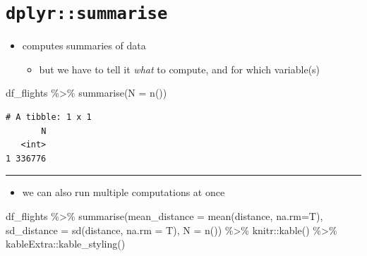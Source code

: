 \documentclass[
  letterpaper,
  DIV=11]{scrartcl}
\newenvironment{Shaded}{\begin{snugshade}}{\end{snugshade}}
\newcommand{\AttributeTok}[1]{\textcolor[rgb]{0.40,0.45,0.13}{#1}}
\newcommand{\FunctionTok}[1]{\textcolor[rgb]{0.28,0.35,0.67}{#1}}
\newcommand{\NormalTok}[1]{\textcolor[rgb]{0.00,0.23,0.31}{#1}}
\newcommand{\SpecialCharTok}[1]{\textcolor[rgb]{0.37,0.37,0.37}{#1}}
\providecommand{\tightlist}{%
  \setlength{\itemsep}{0pt}\setlength{\parskip}{0pt}}\usepackage{longtable,booktabs,array}
\begin{document}
\hypertarget{dplyrsummarise}{%
\section{\texorpdfstring{\texttt{dplyr::summarise}}{dplyr::summarise}}\label{dplyrsummarise}}

\begin{itemize}
\tightlist
\item
  computes summaries of data

  \begin{itemize}
  \tightlist
  \item
    but we have to tell it \emph{what} to compute, and for which
    variable(s)
  \end{itemize}
\end{itemize}

\begin{Shaded}
\begin{Highlighting}[]
\NormalTok{df\_flights }\SpecialCharTok{\%\textgreater{}\%} 
  \FunctionTok{summarise}\NormalTok{(}\AttributeTok{N =} \FunctionTok{n}\NormalTok{())}
\end{Highlighting}
\end{Shaded}

\begin{verbatim}
# A tibble: 1 x 1
       N
   <int>
1 336776
\end{verbatim}

\begin{center}\rule{0.5\linewidth}{0.5pt}\end{center}

\begin{itemize}
\tightlist
\item
  we can also run multiple computations at once
\end{itemize}

\begin{Shaded}
\begin{Highlighting}[]
\NormalTok{df\_flights }\SpecialCharTok{\%\textgreater{}\%} 
  \FunctionTok{summarise}\NormalTok{(}\AttributeTok{mean\_distance =} \FunctionTok{mean}\NormalTok{(distance, }\AttributeTok{na.rm=}\NormalTok{T),}
            \AttributeTok{sd\_distance =} \FunctionTok{sd}\NormalTok{(distance, }\AttributeTok{na.rm =}\NormalTok{ T),}
            \AttributeTok{N =} \FunctionTok{n}\NormalTok{()) }\SpecialCharTok{\%\textgreater{}\%} 
\NormalTok{  knitr}\SpecialCharTok{::}\FunctionTok{kable}\NormalTok{() }\SpecialCharTok{\%\textgreater{}\%} 
\NormalTok{  kableExtra}\SpecialCharTok{::}\FunctionTok{kable\_styling}\NormalTok{()}
\end{Highlighting}
\end{Shaded}
\end{document}
